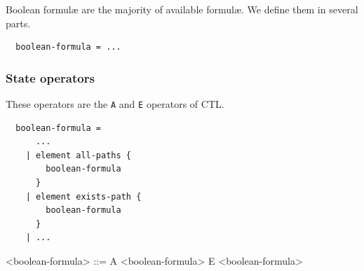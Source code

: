 \documentclass[10pt,english,a4paper]{article}
\begin{document}
Boolean formul{\ae} are the majority of available formul{\ae}.
We define them in several parts.

\begin{lstlisting}
  boolean-formula = ...
\end{lstlisting}




\subsubsection{State operators}

These operators are the \lstinline!A! and \lstinline!E! operators of CTL.

\begin{multicols}{2}
\begin{lstlisting}
  boolean-formula =
      ...
    | element all-paths {
        boolean-formula
      }
    | element exists-path {
        boolean-formula
      }
    | ...
\end{lstlisting}
\columnbreak
\begin{grammar}
<boolean-formula> ::= A <boolean-formula>
\alt E <boolean-formula>
\end{grammar}
\end{multicols}
\end{document}

